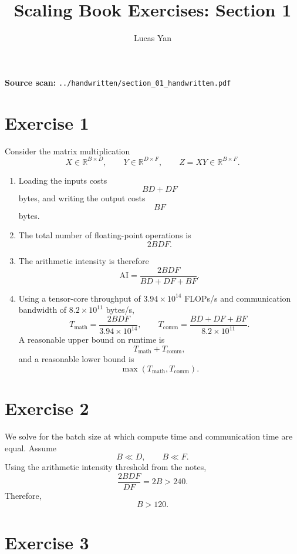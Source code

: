 \documentclass[11pt]{article}
\title{Scaling Book Exercises: Section 1}
\author{Lucas Yan}
\date{}
\newcommand{\AI}{\mathrm{AI}}
\newcommand{\tmath}{T_{\mathrm{math}}}
\newcommand{\tcomm}{T_{\mathrm{comm}}}
\begin{document}
\maketitle

\noindent
\textbf{Source scan:} \texttt{../handwritten/section\_01\_handwritten.pdf}

\section*{Exercise 1}

Consider the matrix multiplication
\[
X \in \mathbb{R}^{B \times D}, \qquad
Y \in \mathbb{R}^{D \times F}, \qquad
Z = XY \in \mathbb{R}^{B \times F}.
\]

\begin{enumerate}[label=(\alph*)]
  \item Loading the inputs costs
  \[
  BD + DF
  \]
  bytes, and writing the output costs
  \[
  BF
  \]
  bytes.

  \item The total number of floating-point operations is
  \[
  2BDF.
  \]

  \item The arithmetic intensity is therefore
  \[
  \AI = \frac{2BDF}{BD + DF + BF}.
  \]

  \item Using a tensor-core throughput of $3.94 \times 10^{14}$ FLOPs/s and communication bandwidth of $8.2 \times 10^{11}$ bytes/s,
  \[
  \tmath = \frac{2BDF}{3.94 \times 10^{14}},
  \qquad
  \tcomm = \frac{BD + DF + BF}{8.2 \times 10^{11}}.
  \]
  A reasonable upper bound on runtime is
  \[
  \tmath + \tcomm,
  \]
  and a reasonable lower bound is
  \[
  \max(\tmath, \tcomm).
  \]
\end{enumerate}

\section*{Exercise 2}

We solve for the batch size at which compute time and communication time are equal. Assume
\[
B \ll D, \qquad B \ll F.
\]
Using the arithmetic intensity threshold from the notes,
\[
\frac{2BDF}{DF} = 2B > 240.
\]
Therefore,
\[
B > 120.
\]

\section*{Exercise 3}
\end{document}
